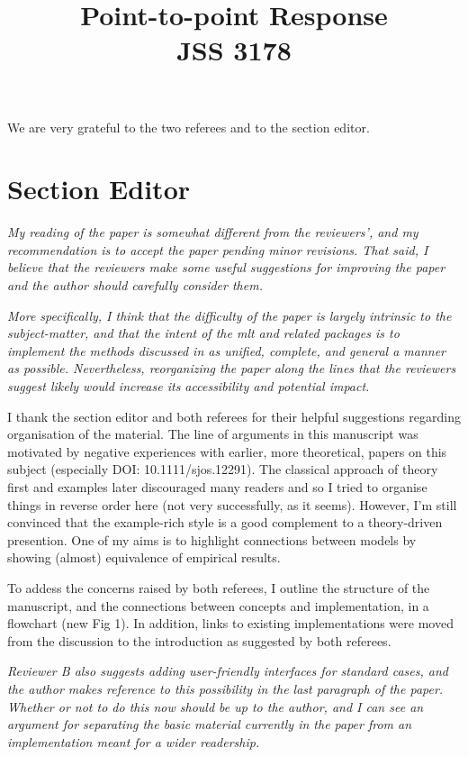 \documentclass[12pt]{article}
\title{Point-to-point Response \\ JSS 3178}
\author{}
\begin{document}
\maketitle

We are very grateful to the two referees and to the section editor.


\section*{Section Editor}

\noindent
\textit{
My reading of the paper is somewhat different from the reviewers', and
my recommendation is to accept the paper pending minor revisions. That
said, I believe that the reviewers make some useful suggestions for
improving the paper and the author should carefully consider them.}

\textit{More specifically, I think that the difficulty of the paper is largely
intrinsic to the subject-matter, and that the intent of the mlt and
related packages is to implement the methods discussed in as unified,
complete, and general a manner as possible. Nevertheless, reorganizing
the paper along the lines that the reviewers suggest likely would
increase its accessibility and potential impact.}

I thank the section editor and both referees for their helpful suggestions
regarding organisation of the material. The line of arguments in this
manuscript was motivated by negative experiences with earlier, more
theoretical, papers on this subject (especially DOI: 10.1111/sjos.12291).
The classical approach of theory first and examples later discouraged many
readers and so I tried to organise things in reverse order here (not very
successfully, as it seems). However, I'm still convinced that the
example-rich style is a good complement to a theory-driven presention. One
of my aims is to highlight connections between models by showing (almost)
equivalence of empirical results. 

To addess the concerns raised by both referees, I outline the structure of
the manuscript, and the connections between concepts and implementation, in
a flowchart (new Fig 1). In addition, links to existing implementations were
moved from the discussion to the introduction as suggested by both referees.

\textit{Reviewer B also suggests adding user-friendly interfaces for standard
cases, and the author makes reference to this possibility in the last
paragraph of the paper. Whether or not to do this now should be up to
the author, and I can see an argument for separating the basic material
currently in the paper from an implementation meant for a wider
readership.}
\end{document}
